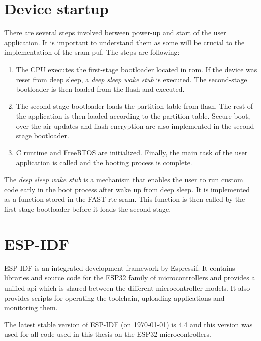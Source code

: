 \section{Device startup}\label{sec:device_startup}

There are several steps involved between power-up and start of the user application. It is important to understand them as some will be crucial to the implementation of the \gls{sram} \gls{puf}. The steps are following:

\begin{enumerate}
    \item The CPU executes the first-stage bootloader located in \gls{rom}. If the device was reset from deep sleep, a \emph{deep sleep wake stub} is executed. The second-stage bootloader is then loaded from the flash and executed.
    \item The second-stage bootloader loads the partition table from flash. The rest of the application is then loaded according to the partition table. Secure boot, over-the-air updates and flash encryption are also implemented in the second-stage bootloader.
    \item C runtime and FreeRTOS are initialized. Finally, the main task of the user application is called and the booting process is complete.
\end{enumerate}

The \emph{deep sleep wake stub} is a mechanism that enables the user to run custom code early in the boot process after wake up from deep sleep. It is implemented as a function stored in the FAST \gls{rtc} \gls{sram}. This function is then called by the first-stage bootloader before it loads the second stage.\cite{espidf2022}

\section{ESP-IDF}

ESP-IDF is an integrated development framework by Espressif. It contains libraries and source code for the ESP32 family of microcontrollers and provides a unified \gls{api} which is shared between the different microcontroller models. It also provides scripts for operating the toolchain, uploading applications and monitoring them.\cite{espidf2022}

The latest stable version of ESP-IDF (on \today) is 4.4 and this version was used for all code used in this thesis on the ESP32 microcontrollers.

